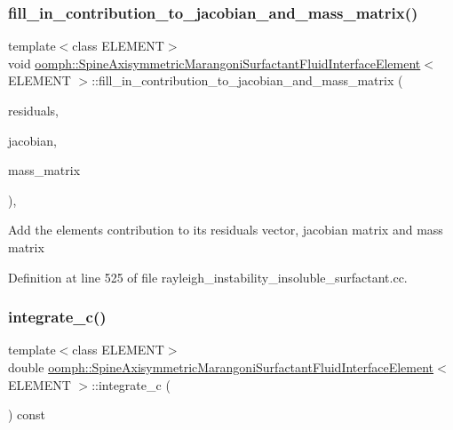 \subsubsection{\texorpdfstring{fill\+\_\+in\+\_\+contribution\+\_\+to\+\_\+jacobian\+\_\+and\+\_\+mass\+\_\+matrix()}{fill\_in\_contribution\_to\_jacobian\_and\_mass\_matrix()}}
{\footnotesize\ttfamily template$<$class E\+L\+E\+M\+E\+NT$>$ \\
void \hyperlink{classoomph_1_1SpineAxisymmetricMarangoniSurfactantFluidInterfaceElement}{oomph\+::\+Spine\+Axisymmetric\+Marangoni\+Surfactant\+Fluid\+Interface\+Element}$<$ E\+L\+E\+M\+E\+NT $>$\+::fill\+\_\+in\+\_\+contribution\+\_\+to\+\_\+jacobian\+\_\+and\+\_\+mass\+\_\+matrix (\begin{DoxyParamCaption}\item[{Vector$<$ double $>$ \&}]{residuals,  }\item[{Dense\+Matrix$<$ double $>$ \&}]{jacobian,  }\item[{Dense\+Matrix$<$ double $>$ \&}]{mass\+\_\+matrix }\end{DoxyParamCaption})\hspace{0.3cm}{\ttfamily [inline]}, {\ttfamily [protected]}}

Add the element\textquotesingle{}s contribution to its residuals vector, jacobian matrix and mass matrix 

Definition at line 525 of file rayleigh\+\_\+instability\+\_\+insoluble\+\_\+surfactant.\+cc.

\mbox{\label{classoomph_1_1SpineAxisymmetricMarangoniSurfactantFluidInterfaceElement_aeb6b9fa726b084884c1e00291d077eea}} 
\subsubsection{\texorpdfstring{integrate\+\_\+c()}{integrate\_c()}}
{\footnotesize\ttfamily template$<$class E\+L\+E\+M\+E\+NT$>$ \\
double \hyperlink{classoomph_1_1SpineAxisymmetricMarangoniSurfactantFluidInterfaceElement}{oomph\+::\+Spine\+Axisymmetric\+Marangoni\+Surfactant\+Fluid\+Interface\+Element}$<$ E\+L\+E\+M\+E\+NT $>$\+::integrate\+\_\+c (\begin{DoxyParamCaption}{ }\end{DoxyParamCaption}) const\hspace{0.3cm}{\ttfamily [inline]}}



